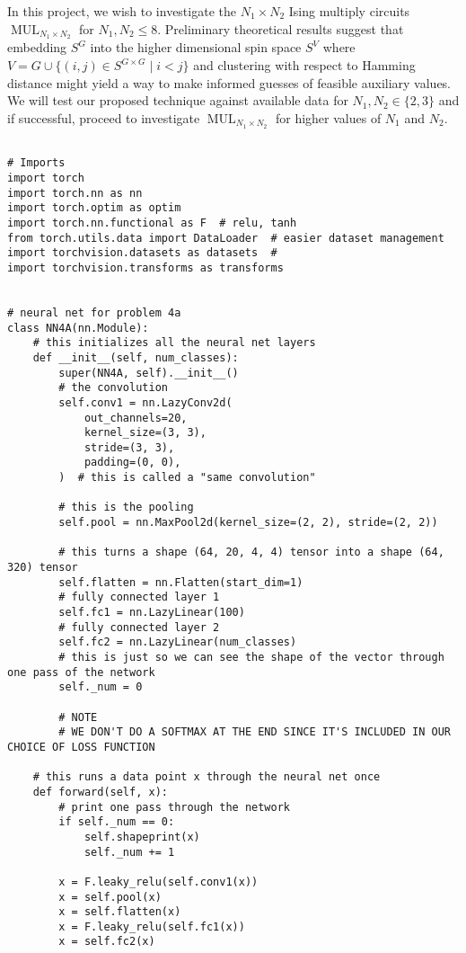 \begin{homework}[e]
  In this project, we wish to investigate the $N_1\times N_2$ Ising multiply circuits $\operatorname{MUL}_{N_1\times N_2}$ for $N_1, N_2 \leq 8$. Preliminary theoretical results suggest that embedding $S^G$ into the higher dimensional spin space $S^V$ where $V = G \cup \{(i,j) \in S^{G\times G}\mid i < j\}$ and clustering with respect to Hamming distance might yield a way to make informed guesses of feasible auxiliary values. We will test our proposed technique against available data for $N_1,N_2 \in \{2,3\}$ and if successful, proceed to investigate $\operatorname{MUL}_{N_1\times N_2}$ for higher values of $N_{1}$ and $N_2$.
\end{homework}
\newpage
\begin{verbatim}  

# Imports
import torch
import torch.nn as nn
import torch.optim as optim
import torch.nn.functional as F  # relu, tanh
from torch.utils.data import DataLoader  # easier dataset management
import torchvision.datasets as datasets  #
import torchvision.transforms as transforms


# neural net for problem 4a
class NN4A(nn.Module):
    # this initializes all the neural net layers
    def __init__(self, num_classes):
        super(NN4A, self).__init__()
        # the convolution
        self.conv1 = nn.LazyConv2d(
            out_channels=20,
            kernel_size=(3, 3),
            stride=(3, 3),
            padding=(0, 0),
        )  # this is called a "same convolution"

        # this is the pooling
        self.pool = nn.MaxPool2d(kernel_size=(2, 2), stride=(2, 2))

        # this turns a shape (64, 20, 4, 4) tensor into a shape (64, 320) tensor
        self.flatten = nn.Flatten(start_dim=1)
        # fully connected layer 1
        self.fc1 = nn.LazyLinear(100)
        # fully connected layer 2
        self.fc2 = nn.LazyLinear(num_classes)
        # this is just so we can see the shape of the vector through one pass of the network
        self._num = 0

        # NOTE
        # WE DON'T DO A SOFTMAX AT THE END SINCE IT'S INCLUDED IN OUR CHOICE OF LOSS FUNCTION

    # this runs a data point x through the neural net once
    def forward(self, x):
        # print one pass through the network
        if self._num == 0:
            self.shapeprint(x)
            self._num += 1

        x = F.leaky_relu(self.conv1(x))
        x = self.pool(x)
        x = self.flatten(x)
        x = F.leaky_relu(self.fc1(x))
        x = self.fc2(x)


\end{verbatim}

